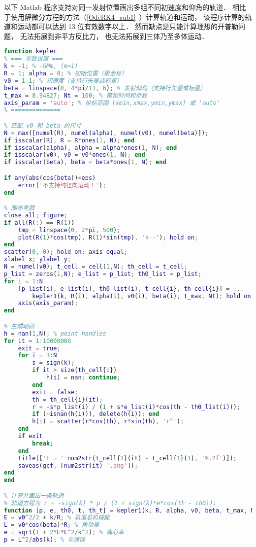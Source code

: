 以下 Matlab 程序支持对同一发射位置画出多组不同初速度和仰角的轨道． 相比于使用解微分方程的方法（\autoref{OdeRK4_sub1}~）计算轨道和运动， 该程序计算的轨道和运动都可以达到 13 位有效数字以上． 然而缺点是只能计算理想的开普勒问题， 无法拓展到非平方反比力， 也无法拓展到三体乃至多体运动．

\begin{lstlisting}[language=matlab,caption=kepler.m]
% 已知初始位置、发射速度、发射方向， 求轨道以及运动方程
function kepler
% === 参数设置 ===
k = -1; % -GMm, (m=1)
R = 1; alpha = 0; % 初始位置（极坐标）
v0 = 1.1; % 初速度（支持行矢量或标量）
beta = linspace(0, 4*pi/11, 6); % 发射仰角（支持行矢量或标量）
t_max = 8.94827; Nt = 100; % 模拟时间和步数
axis_param = 'auto'; % 坐标范围 [xmin,xmax,ymin,ymax] 或 'auto'
% ==============

% 匹配 v0 和 beta 的尺寸
N = max([numel(R), numel(alpha), numel(v0), numel(beta)]);
if isscalar(R), R = R*ones(1, N); end
if isscalar(alpha), alpha = alpha*ones(1, N); end
if isscalar(v0), v0 = v0*ones(1, N); end
if isscalar(beta), beta = beta*ones(1, N); end

if any(abs(cos(beta))<eps)
    error('不支持纯径向运动！');
end

% 画参考圆
close all; figure;
if all(R(:) == R(1))
    tmp = linspace(0, 2*pi, 500);
    plot(R(1)*cos(tmp), R(1)*sin(tmp), 'k--'); hold on;
end
scatter(0, 0); hold on; axis equal;
xlabel x; ylabel y;
N = numel(v0); t_cell = cell(1,N); th_cell = t_cell;
p_list = zeros(1,N); e_list = p_list; th0_list = p_list;
for i = 1:N
    [p_list(i), e_list(i), th0_list(i), t_cell{i}, th_cell{i}] = ...
        kepler1(k, R(i), alpha(i), v0(i), beta(i), t_max, Nt); hold on;
    axis(axis_param);
end

% 生成动画
h = nan(1,N); % point handles
for it = 1:10000000
    exit = true;
    for i = 1:N
        s = sign(k);
        if it > size(th_cell{i})
            h(i) = nan; continue;
        end
        exit = false;
        th = th_cell{i}(it);
        r = -s*p_list(i) / (1 + s*e_list(i)*cos(th - th0_list(i)));
        if (~isnan(h(i))), delete(h(i)); end
        h(i) = scatter(r*cos(th), r*sin(th), 'r^');
    end
    if exit
        break;
    end
    title(['t = ' num2str(t_cell{1}(it) - t_cell{1}(1), '%.2f')]);
    saveas(gcf, [num2str(it) '.png']);
end
end

% 计算并画出一条轨道
% 轨道方程为 r = -sign(k) * p / (1 + sign(k)*e*cos(th - th0));
function [p, e, th0, t, th_t] = kepler1(k, R, alpha, v0, beta, t_max, Nt)
E = v0^2/2 + k/R; % 轨道总机械能
L = v0*cos(beta)*R; % 角动量
e = sqrt(1 + 2*E*L^2/k^2); % 离心率
p = L^2/abs(k); % 半通径


\end{lstlisting}
